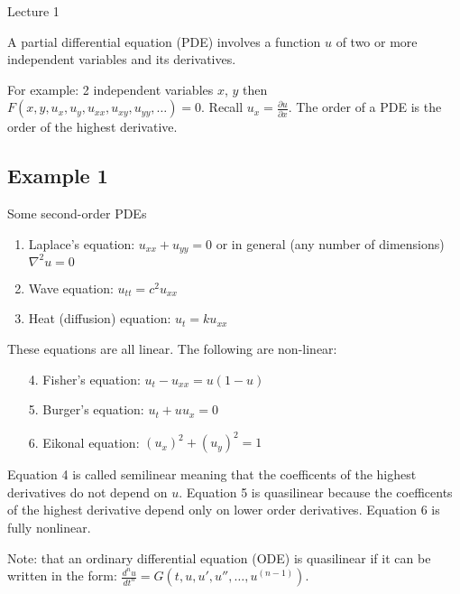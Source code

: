 \begin{center}

Lecture 1

\end{center}

A partial differential equation (PDE) involves a function $u$ of two or more independent variables and its derivatives.

For example: 2 independent variables $x$, $y$ then $F(x, y, u_x, u_y, u_{xx}, u_{xy}, u_{yy}, \ldots) = 0$. Recall $u_x = \frac{\partial u}{\partial x}$. The order of a PDE is the order of the highest derivative. 

\subsection*{Example 1}

Some second-order PDEs 

\begin{enumerate}

\item Laplace's equation: $u_{xx} + u_{yy} = 0$ or in general (any number of dimensions) $\nabla^2 u = 0$

\item Wave equation: $u_{tt} = c^2 u_{xx}$

\item Heat (diffusion) equation: $u_t = k u_{xx}$

\end{enumerate}

These equations are all linear. The following are non-linear:

\begin{enumerate}

\item[4.] Fisher's equation: $u_t - u_{xx} = u(1-u)$

\item[5.] Burger's equation: $u_t + u u_x = 0$

\item[6.] Eikonal equation: $(u_x)^2 + (u_y)^2 = 1$

\end{enumerate}

Equation 4 is called semilinear meaning that the coefficents of the highest derivatives do not depend on $u$. Equation 5 is quasilinear because the coefficents of the highest derivative depend only on lower order derivatives. Equation 6 is fully nonlinear.

Note: that an ordinary differential equation (ODE) is quasilinear if it can be written in the form: $\displaystyle \frac{d^n u}{d t^n} = G(t, u, u', u'', \ldots, u^{(n-1)})$. 

